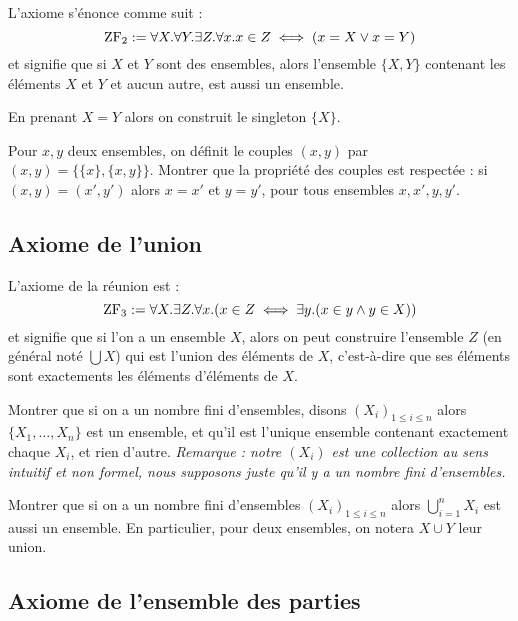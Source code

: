 \begin{ax}[Paire]
    L'axiome s'énonce comme suit : $$\mathrm{ZF}_2 := \forall X.\forall Y. \exists Z. \forall x. x\in Z \iff (x=X \lor x=Y)$$ et signifie que si $X$ et $Y$ sont des ensembles, alors l'ensemble $\{X,Y\}$ contenant les éléments $X$ et $Y$ et aucun autre, est aussi un ensemble.
\end{ax}

\begin{rmk}
    En prenant $X=Y$ alors on construit le singleton $\{X\}$.
\end{rmk}

\begin{exo}
    Pour $x,y$ deux ensembles, on définit le couples $(x,y)$ par $(x,y) = \{\{x\},\{x,y\}\}$. Montrer que la propriété des couples est respectée : si $(x,y)=(x',y')$ alors $x=x'$ et $y=y'$, pour tous ensembles $x,x',y,y'$.
\end{exo}

\subsection{Axiome de l'union}

\begin{ax}[Union]
    L'axiome de la réunion est : $$\mathrm{ZF}_3 := \forall X.\exists Z. \forall x. (x\in Z \iff \exists y. (x\in y\land y\in X))$$ et signifie que si l'on a un ensemble $X$, alors on peut construire l'ensemble $Z$ (en général noté $\bigcup X$) qui est l'union des éléments de $X$, c'est-à-dire que ses éléments sont exactements les éléments d'éléments de $X$.
\end{ax}

\begin{exo}
    Montrer que si on a un nombre fini d'ensembles, disons $(X_i)_{1\leq i\leq n}$ alors $\{X_1,\ldots,X_n\}$ est un ensemble, et qu'il est l'unique ensemble contenant exactement chaque $X_i$, et rien d'autre. \textit{Remarque : notre $(X_i)$ est une collection au sens intuitif et non formel, nous supposons juste qu'il y a un nombre fini d'ensembles.}
\end{exo}

\begin{exo}
    Montrer que si on a un nombre fini d'ensembles $(X_i)_{1\leq i \leq n}$ alors $\displaystyle{\bigcup_{i = 1}^n X_i}$ est aussi un ensemble. En particulier, pour deux ensembles, on notera $X\cup Y$ leur union.
\end{exo}

\subsection{Axiome de l'ensemble des parties}

